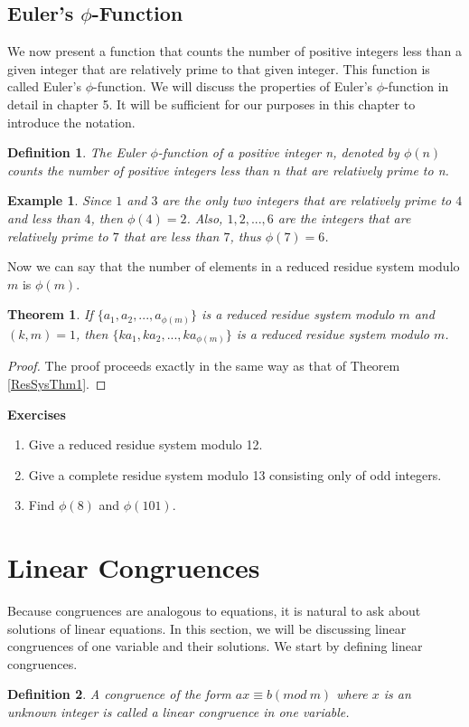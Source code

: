 \documentclass[12pt,letterpaper]{book}
\newtheorem{definition}{Definition}
\newtheorem{theorem}{Theorem}
\newtheorem{example}{Example}
\begin{document}
\subsection{Euler's $\phi$-Function}

\par We now present a function that counts the number of positive
integers less than a given integer that are relatively prime to that
given integer. This function is called Euler's $\phi$-function. We
will discuss the properties of Euler's $\phi$-function in detail in
chapter 5. It will be sufficient for our purposes in this chapter to
introduce the notation. 
\begin{definition}
The Euler $\phi$-function of a positive integer n, denoted by
$\phi(n)$ counts the number of positive integers less than $n$ that
are relatively prime to n.
\end{definition}

\begin{example}
Since $1$ and $3$ are the only two integers that are relatively prime to
$4$ and less than $4$, then $\phi(4)=2$.  Also, $1,2,...,6$ are the
integers that are relatively prime to $7$ that are less than $7$, thus
$\phi(7)=6$.
\end{example}

Now we can say that the number of elements in a reduced residue
system modulo $m$ is $\phi(m)$.

\begin{theorem}\label{ResSysThm2}
If $\{a_1,a_2,...,a_{\phi(m)}\}$ is a reduced residue system modulo $m$
and $(k,m)=1$, then $\{ka_1,ka_2,...,ka_{\phi(m)}\}$ is a reduced
residue system modulo $m$.
\end{theorem}

\begin{proof}
The proof proceeds exactly in the same way as that of Theorem \ref{ResSysThm1}.
\end{proof}

\textbf{Exercises}
\begin{enumerate}
\item{Give a reduced residue system  modulo 12.} \item{Give a
complete residue system modulo 13 consisting only of odd
integers.}\item{Find $\phi(8)$ and $\phi(101)$.}
\end{enumerate}

\newpage

\section{Linear Congruences}
Because congruences are analogous to equations, it is natural to ask
about solutions of linear equations.  In this section, we will be
discussing linear congruences of one variable and their solutions.
We start by defining linear congruences. 
\begin{definition}
A congruence of the form $ax\equiv b(mod\ m)$ where $x$ is an
unknown integer is called a linear congruence in one variable.
\end{definition}
\end{document}
